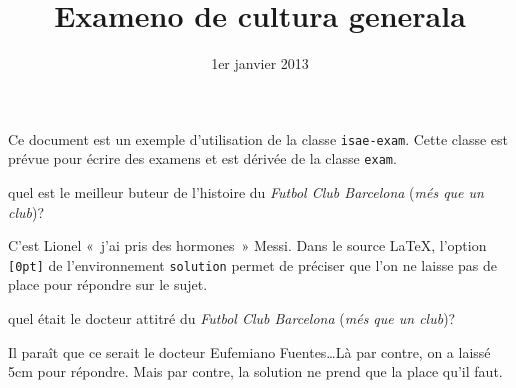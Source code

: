 \documentclass[addpoints,fr,biblatex,name,gradetable]{isae-exam}
\title[Exameno de cultura, question \thequestion]{Exameno de cultura generala}
\date{1er janvier 2013}
\begin{document}
\begin{coverpages}
  \basiccoverpage{}
\end{coverpages}

Ce document est un exemple d'utilisation de la classe
\texttt{isae-exam}. Cette classe est prévue pour écrire des examens et
est dérivée de la classe \texttt{exam}.

\begin{questions}
\question quel est le meilleur buteur de l'histoire du \textit{Futbol
  Club Barcelona} (\textit{més que un club})?

\begin{solution}[0pt]

  C'est Lionel «~j'ai pris des hormones~» Messi. Dans le source
  \LaTeX, l'option \lstinline![0pt]! de l'environnement
  \lstinline!solution! permet de préciser que l'on ne laisse pas de
  place pour répondre sur le sujet.
\end{solution}

\question quel était le docteur attitré du \textit{Futbol
  Club Barcelona} (\textit{més que un club})?

\begin{solution}[5cm]

  Il paraît que ce serait le docteur Eufemiano Fuentes\ldots Là par
  contre, on a laissé 5cm pour répondre. Mais par contre, la
  solution ne prend que la place qu'il faut.
\end{solution}
\end{questions}
\end{document}
